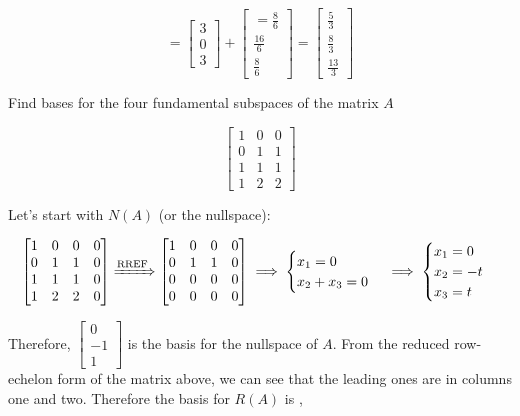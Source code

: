 \documentclass{report}
\begin{document}
$$
= \begin{bmatrix} 3 \\ 0 \\ 3 \end{bmatrix} + \begin{bmatrix} =\frac{8}{6} \\ \frac{16}{6} \\ \frac{8}{6} \end{bmatrix} = \boxed{\begin{bmatrix} \frac{5}{3} \\ \frac{8}{3} \\ \frac{13}{3} \end{bmatrix}}
$$

\begin{tcolorbox}[colframe = lightred]
	Find bases for the four fundamental subspaces of the matrix $A$
	
	$$
	\begin{bmatrix} 1 & 0 & 0 \\ 0 & 1 & 1 \\ 1 & 1  & 1 \\ 1 & 2 & 2 \end{bmatrix}
	$$
\end{tcolorbox}

Let's start with $N(A)$ (or the nullspace):

$$
\begin{bmatrix} 1  & 0 & 0 & 0 \\ 0 & 1 & 1 & 0 \\ 1 & 1 & 1 & 0 \\ 1 & 2 & 2 & 0 \end{bmatrix} \xRightarrow{\text{RREF}} \begin{bmatrix} 1 & 0 & 0 & 0 \\ 0 & 1  & 1 & 0 \\ 0 & 0 & 0 & 0 \\ 0 & 0 & 0 & 0 \end{bmatrix} \implies 
\begin{cases}
	x_1 = 0 \\ x_2 + x_3 = 0
\end{cases}
\implies
\begin{cases}
	x_1 = 0 \\ x_2 = -t \\ x_3 = t 
\end{cases}
$$

Therefore, $\begin{bmatrix} 0 \\ -1 \\ 1 \end{bmatrix}$ is the basis for the nullspace of $A$. From the reduced row-echelon form of the matrix above, we can see that the leading ones are in columns one and two. Therefore the basis for $R(A)$ is ,
\end{document}

